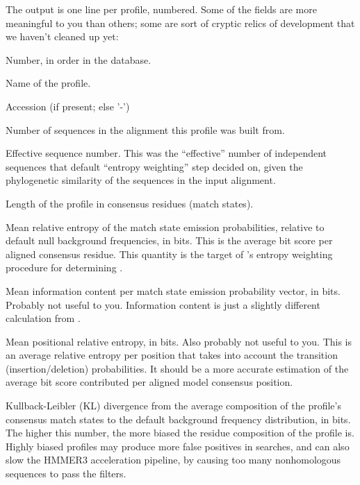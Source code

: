 The output is one line per profile, numbered. Some of the fields are
more meaningful to you than others; some are sort of cryptic relics
of development that we haven't cleaned up yet:

\begin{sreitems}{}

\item [\monob{idx}]       Number, in order in the database.
\item [\monob{name}]      Name of the profile.
\item [\monob{accession}] Accession (if present; else '-')
\item [\monob{nseq}]      Number of sequences in the alignment this
  profile was built from.

\item [\monob{eff\_nseq}]  Effective sequence number. 
   This was the ``effective'' number of independent sequences that
    default ``entropy weighting'' step decided on,
   given the phylogenetic similarity of the  sequences in
   the input alignment.
   
\item [\monob{M}] Length of the profile in consensus residues (match states).

\item [\monob{relent}] Mean relative entropy of the match state
  emission probabilities, relative to default null background
  frequencies, in bits. This is the average bit score per aligned
  consensus residue. This quantity is the target of 's
  entropy weighting procedure for determining .

\item [\monob{info}] Mean information content per match state emission
  probability vector, in bits. Probably not useful to you. Information
  content is just a slightly different calculation from
  .

\item [\monob{p relE}] Mean positional relative entropy, in bits.
  Also probably not useful to you. This is an average relative entropy
  per position that takes into account the transition
  (insertion/deletion) probabilities.  It should be a more accurate
  estimation of the average bit score contributed per aligned model
  consensus position.

\item [\monob{compKL}] Kullback-Leibler (KL) divergence from the
  average composition of the profile's consensus match states to the
  default background frequency distribution, in bits.  The higher this
  number, the more biased the residue composition of the profile
  is. Highly biased profiles may produce more false positives in
  searches, and can also slow the HMMER3 acceleration pipeline, by
  causing too many nonhomologous sequences to pass the filters.

\end{sreitems}


